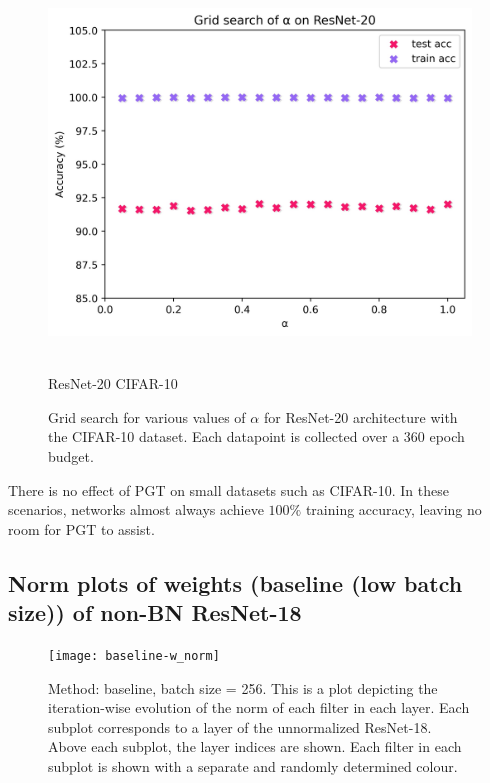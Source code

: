 \documentclass[runningheads]{llncs}
\begin{document}
\begin{figure}[ht]
\centering
\includegraphics[width=0.5\columnwidth]{cifar10_grid_search}
\caption{\\ResNet-20 CIFAR-10}
\caption{ Grid search for various values of $\alpha$ for ResNet-20 architecture with the
CIFAR-10 dataset. Each datapoint is collected over a 360 epoch budget. }
\label{fig:grid_searchc}
\end{figure}


There is no effect of PGT on small datasets such as CIFAR-10. In these scenarios,
networks almost always achieve $100\%$ training accuracy, leaving no room for PGT to
assist.



\clearpage

\subsection{Norm plots of weights (baseline (low batch size)) of non-BN ResNet-18}
\label{sec:plots1}
\begin{figure}[ht] \centering \texttt{[image: baseline-w\_norm]}
\caption{ Method: baseline, batch size = 256. This is a plot depicting the
iteration-wise evolution of the norm of each filter in each layer. Each subplot
corresponds to a layer of the unnormalized ResNet-18. Above each subplot, the layer
indices are shown. Each filter in each subplot is shown with a separate and randomly
determined colour. } \end{figure}

\clearpage
\end{document}
